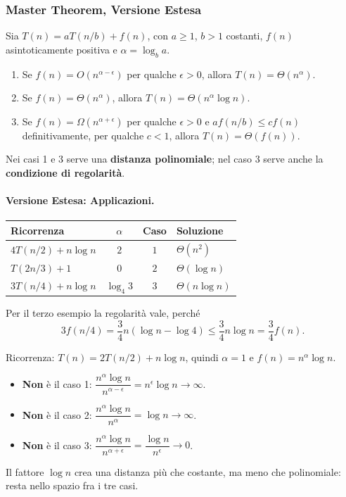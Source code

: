 \documentclass[12pt, a4paper]{article}
\begin{document}
\subsubsection{Master Theorem, Versione Estesa}

\begin{tcolorbox}[colback=lightergray!10, colframe=tocsec, title=\textbf{Teorema (Master Theorem, Versione Estesa)}]
\label{teo:master-esteso}
Sia $T(n)=aT(n/b)+f(n)$, con $a\ge 1$, $b>1$ costanti, $f(n)$ asintoticamente positiva e $\alpha=\log_b a$.
\begin{enumerate}
    \item Se $f(n)=O(n^{\alpha-\epsilon})$ per qualche $\epsilon>0$, allora $T(n)=\Theta(n^\alpha)$.
    \item Se $f(n)=\Theta(n^\alpha)$, allora $T(n)=\Theta(n^\alpha\log n)$.
    \item Se $f(n)=\Omega(n^{\alpha+\epsilon})$ per qualche $\epsilon>0$ e $af(n/b)\le cf(n)$ definitivamente, per qualche $c<1$, allora $T(n)=\Theta(f(n))$.
\end{enumerate}
Nei casi 1 e 3 serve una \textbf{distanza polinomiale}; nel caso 3 serve anche la \textbf{condizione di regolarità}.
\end{tcolorbox}

\paragraph{Versione Estesa: Applicazioni.}
\begin{center}
\begin{tabular}{lccl}
\toprule
\textbf{Ricorrenza} & $\alpha$ & \textbf{Caso} & \textbf{Soluzione} \\
\midrule
$4T(n/2)+n\log n$ & $2$ & $1$ & $\Theta(n^2)$ \\
$T(2n/3)+1$ & $0$ & $2$ & $\Theta(\log n)$ \\
$3T(n/4)+n\log n$ & $\log_4 3$ & $3$ & $\Theta(n\log n)$ \\
\bottomrule
\end{tabular}
\end{center}
Per il terzo esempio la regolarità vale, perché
$$3f(n/4) = \frac{3}{4}n(\log n - \log 4) \le \frac{3}{4}n\log n = \frac{3}{4}f(n).$$

\begin{tcolorbox}[colback=lightergray!5, colframe=tocsubsec, title=\textbf{Che Cosa Significa un Tentativo Fallito?}]
Ricorrenza: $T(n)=2T(n/2)+n\log n$, quindi $\alpha=1$ e $f(n)=n^\alpha\log n$.
\begin{itemize}
    \item \textbf{Non} è il caso 1: $\dfrac{n^\alpha\log n}{n^{\alpha-\epsilon}} = n^\epsilon\log n \to \infty$.
    \item \textbf{Non} è il caso 2: $\dfrac{n^\alpha\log n}{n^\alpha} = \log n \to \infty$.
    \item \textbf{Non} è il caso 3: $\dfrac{n^\alpha\log n}{n^{\alpha+\epsilon}} = \dfrac{\log n}{n^\epsilon} \to 0$.
\end{itemize}
Il fattore $\log n$ crea una distanza più che costante, ma meno che polinomiale: resta nello spazio fra i tre casi.
\end{tcolorbox}
\end{document}
